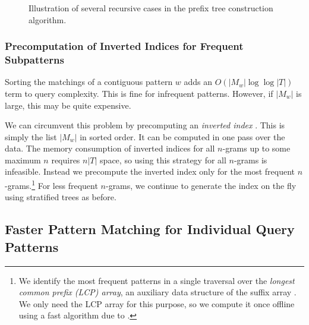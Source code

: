 
\figpreamble
\begin{figure}
	\figfontsize{
	\begin{center}
		
	\end{center}}
	\figpostamble
	\caption{Illustration of several recursive cases in the prefix tree construction algorithm.}
	\label{fig:prefix-tree-recursive-cases}
\end{figure}





\subsubsection{Precomputation of Inverted Indices for Frequent Subpatterns}\label{sec:inverted-indices}

Sorting the matchings of a contiguous pattern $w$
adds an $O(|M_w| \log\log |T|)$ term to 
query complexity.  This is fine for infrequent patterns. However,
if $|M_w|$ is large, this may be quite expensive.

We can circumvent this problem by precomputing an 
{\em inverted index} \citep{Zobel:2006:csur}.
This is simply the list $|M_w|$ in sorted order.  
It can be computed in one pass over the data.  The memory consumption
of inverted indices for all $n$-grams up to some maximum
$n$ requires $n |T|$ space, so using this strategy for all
$n$-grams is infeasible.
Instead we precompute the inverted index only for the most
frequent $n$-grams.\footnote{We identify the most frequent patterns
in a single traversal over the {\em longest common prefix (LCP) array},
an auxiliary data structure of the suffix array 
\citep{Manber:1993:sicomp}.  We only need the LCP array for this purpose, 
so we compute it once offline using a fast algorithm due to 
\citet{Kasai:2001:cpm}.} For less frequent $n$-grams, we continue to 
generate the index on the fly using stratified trees as before.

\subsection{Faster Pattern Matching for Individual Query Patterns}
\label{sec:efficient-lookup}

